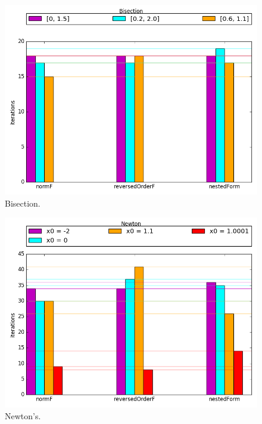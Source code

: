 \documentclass{article}
\begin{document}
			\begin{center} \begin{figure}[!ht]
				\begin{mdframed} \begin{center}
					\includegraphics[scale=0.6]{./imgs/Ex2Bis.png}
					\caption{Bisection.}
				\end{center} \end{mdframed}
				\label{fig:barPlot1}
			\end{figure} \end{center}


			\begin{center} \begin{figure}[!ht]
				\begin{mdframed} \begin{center}
					\includegraphics[scale=0.6]{./imgs/Ex2Nwt.png}
					\caption{Newton's.}
				\end{center} \end{mdframed}
				\label{fig:barPlot2}
			\end{figure} \end{center}
\end{document}
